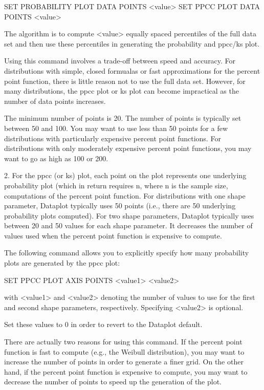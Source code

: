 {              SET PROBABILITY PLOT DATA POINTS <value>
              SET PPCC PLOT DATA POINTS <value>
 
          The algorithm is to compute <value> equally spaced
          percentiles of the full data set and then use these
          percentiles in generating the probability and
          ppcc/ks plot.
 
          Using this command involves a trade-off between speed
          and accuracy.  For distributions with simple, closed
          formualas or fast approximations for the percent point
          function, there is little reason not to use the full data
          set.  However, for many distributions, the ppcc plot or
          ks plot can become impractical as the number of data points
          increases.
 
          The minimum number of points is 20.  The number of
          points is typically set between 50 and 100.  You may
          want to use less than 50 points for a few distributions
          with particularly expensive percent point functions.
          For distributions with only moderately expensive percent
          point functions, you may want to go as high as 100 or
          200.
 
       2. For the ppcc (or ks) plot, each point on the plot
          represents one underlying probability plot (which in
          return requires n, where n is the sample size, computations
          of the percent point function.  For distributions with
          one shape parameter, Dataplot typically uses 50 points
          (i.e., there are 50 underlying probability plots
          computed).  For two shape parameters, Dataplot typically
          uses between 20 and 50 values for each shape parameter.
          It decreases the number of values used when the percent
          point function is expensive to compute.
 
          The following command allows you to explicitly specify
          how many probability plots are generated by the ppcc plot:
 
             SET PPCC PLOT AXIS POINTS <value1>  <value2>
 
          with <value1> and <value2> denoting the number of values
          to use for the first and second shape parameters,
          respectively.  Specifying <value2> is optional.
 
          Set these values to 0 in order to revert to the Dataplot
          default.
 
          There are actually two reasons for using this command.
          If the percent point function is fast to compute (e.g.,
          the Weibull distribution), you may want to increase the
          number of points in order to generate a finer grid.  On
          the other hand, if the percent point function is
          expensive to compute, you may want to decrease the
          number of points to speed up the generation of the plot.
          
}

